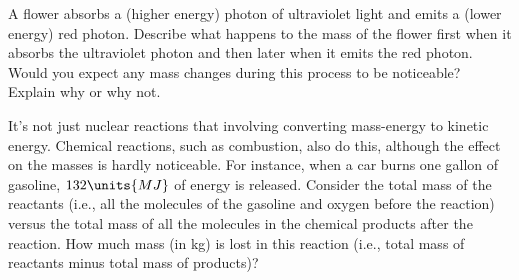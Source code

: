 \newpage
\begin{problem}
  A flower absorbs a (higher energy) photon of ultraviolet light and
  emits a (lower energy) red photon. Describe what happens to the mass 
  of the flower first when it absorbs the ultraviolet photon and then
  later when it emits the red photon.  Would you expect any mass
  changes during this process to be noticeable?  Explain why or why not.
\end{problem}

\begin{problem}
  It's not just nuclear reactions that involving converting mass-energy to
  kinetic energy.  Chemical reactions, such as combustion, also do this,
  although the effect on the masses is hardly noticeable.  For instance,
  when a car burns one gallon of gasoline, $132\units{MJ}$ of energy
  is released.  Consider the total mass of the reactants (i.e., all
  the molecules of the gasoline and oxygen before the reaction) versus
  the total mass of all the molecules in the chemical products after
  the reaction.  How much mass (in kg) is lost in this reaction (i.e.,
  total mass of reactants minus total mass of products)?
\end{problem}

